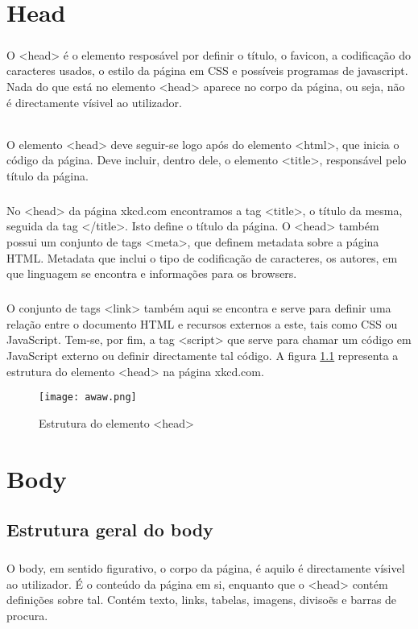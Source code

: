 \documentclass[a4paper,12pt,openright,oneside]{report}
\begin{document}
\chapter{Head}
\paragraph{}
O <head> é o elemento resposável por definir o título, o favicon, a codificação do caracteres usados, o estilo da página em CSS e possíveis programas de javascript. Nada do que está no elemento <head> aparece no corpo da página, ou seja, não é directamente vísivel ao utilizador.
\subparagraph{}
O elemento <head> deve seguir-se logo após do elemento <html>, que inicia o código da página. Deve incluir, dentro dele, o elemento <title>, responsável pelo título da página.
\paragraph{}
No <head> da página xkcd.com encontramos a tag <title>, o título da mesma, seguida da tag </title>. Isto define o título da página. 
O <head> também possui um conjunto de tags <meta>, que definem metadata sobre a página HTML. Metadata que inclui o tipo de codificação de caracteres, os autores, em que linguagem se encontra e informações para os browsers. 
\paragraph{}
O conjunto de tags <link> também aqui se encontra e serve para definir uma relação entre o documento HTML e recursos externos a este, tais como CSS ou JavaScript.
Tem-se, por fim, a tag <script> que serve para chamar um código em JavaScript externo ou definir directamente tal código.
A figura \ref{awaw} representa a estrutura do elemento <head> na página xkcd.com. \cite{Guião}
 
\begin{figure}[h!]
\center
\texttt{[image: awaw.png]}
\caption{Estrutura do elemento <head>}
\label{awaw}
\end{figure}

\chapter{Body}
\section{Estrutura geral do body}
\paragraph{}
O body, em sentido figurativo, o corpo da página, é aquilo é directamente vísivel ao utilizador. É o conteúdo da página em si, enquanto que o <head> contém definições sobre tal. Contém texto, links, tabelas, imagens, divisoẽs e barras de procura. 
\end{document}
